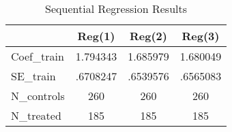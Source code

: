 \begin{table}[htbp]\centering
\caption{Sequential Regression Results}
\begin{tabular}{l*{3}{c}}
\hline\hline
            &      Reg(1)&      Reg(2)&      Reg(3)\\
\hline
Coef\_train  &    1.794343&    1.685979&    1.680049\\
SE\_train    &    .6708247&    .6539576&    .6565083\\
N\_controls  &         260&         260&         260\\
N\_treated   &         185&         185&         185\\
\hline\hline
\end{tabular}
\end{table}

